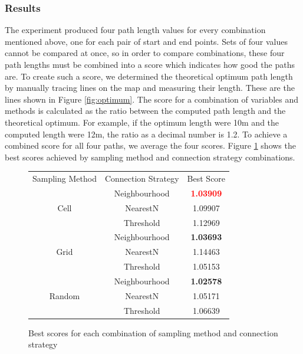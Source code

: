 \documentclass[conference]{IEEEtran}
\begin{document}
\subsubsection{Results}
The experiment produced four path length values for every combination mentioned above, one for each pair of start and end points. Sets of four values cannot be compared at once, so in order to compare combinations, these four path lengths must be combined into a score which indicates how good the paths are. To create such a score, we determined the theoretical optimum path length by manually tracing lines on the map and measuring their length. These are the lines shown in Figure \ref{fig:optimum}. The score for a combination of variables and methods is calculated as the ratio between the computed path length and the theoretical optimum. For example, if the optimum length were 10m and the computed length were 12m, the ratio as a decimal number is 1.2. To achieve a combined score for all four paths, we average the four scores. Figure \ref{fig:sampleconntable} shows the best scores achieved by sampling method and connection strategy combinations.
\begin{figure}
  \centering
  \begin{tabular}{|c|c|c|}
    \cline{1-3}
    Sampling Method & Connection Strategy & Best Score      \\ \cline{1-3}
    \multirow{3}{*}{Cell} & Neighbourhood & \textbf{\textcolor{red}{1.03909}}         \\ \cline{2-3}
    & NearestN  & 1.09907                                     \\ \cline{2-3}
    & Threshold & 1.12969                                       \\ \cline{1-3}
    \multirow{3}{*}{Grid} & Neighbourhood & \textbf{1.03693}                          \\ \cline{2-3}
    & NearestN & 1.14463                                        \\ \cline{2-3}
    & Threshold & 1.05153                                       \\ \cline{1-3}
    \multirow{3}{*}{Random} & Neighbourhood & \textbf{1.02578}                        \\ \cline{2-3}
    & NearestN & 1.05171                                      \\ \cline{2-3}
    & Threshold & 1.06639                                     \\ \cline{1-3}
 \end{tabular}
  \caption{Best scores for each combination of sampling method and connection strategy}
  \label{fig:sampleconntable}
\end{figure}
\end{document}
